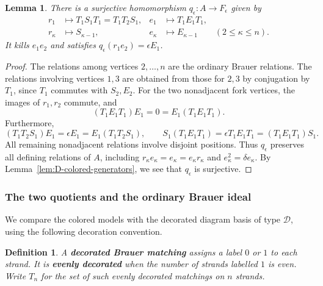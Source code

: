 \documentclass[11pt,a4paper]{amsart}
\newtheorem{lemma}[theorem]{Lemma}
\theoremstyle{uprightdefinition}
\newtheorem{definition}[theorem]{Definition}
\theoremstyle{remark}\newtheorem{remark}[theorem]{Remark}
\begin{document}
\begin{lemma}\label{lem:D-colored-map}
There is a surjective homomorphism $q_\epsilon:A\to F_\epsilon$ given by
\begin{align*}
 r_1&\longmapsto T_1S_1T_1=T_1T_2S_1,
 &e_1&\longmapsto T_1E_1T_1,\\
 r_{\kappa}&\longmapsto S_{\kappa-1},
 &e_{\kappa}&\longmapsto E_{\kappa-1}\qquad(2\leq \kappa\leq n).
\end{align*}
It kills $e_1e_2$ and satisfies $q_\epsilon(r_1e_2)=\epsilon E_1$.
\end{lemma}
\begin{proof}
The relations among vertices $2,\ldots,n$ are the ordinary Brauer
relations. The relations involving vertices $1,3$ are obtained from those
for $2,3$ by conjugation by $T_1$, since $T_1$ commutes with $S_2,E_2$.
For the two nonadjacent fork vertices, the images of $r_1,r_2$ commute,
and
\[
 (T_1E_1T_1)E_1=0=E_1(T_1E_1T_1).
\]
Furthermore,
\[
 (T_1T_2S_1)E_1=\epsilon E_1
   =E_1(T_1T_2S_1),\qquad
 S_1(T_1E_1T_1)=\epsilon T_1E_1T_1
   =(T_1E_1T_1)S_1.
\]
All remaining nonadjacent relations involve disjoint positions. Thus $q_\epsilon$ preserves all defining relations of $A$, including $r_{\kappa}e_{\kappa}=e_{\kappa}=e_{\kappa}r_{\kappa}$ and
$e_{\kappa}^2=\delta e_{\kappa}$. By Lemma~\ref{lem:D-colored-generators}, we see that $q_\epsilon$ is surjective.
\end{proof}

\subsubsection{The two quotients and the ordinary Brauer ideal}

We compare the colored models with the decorated diagram basis of type
$\mathscr{D}$, using the following decoration convention.

\begin{definition}\label{def:decorated-matchings}
\cite[Definition~4.2]{CGWDiagrams2007}
A
\textbf{decorated Brauer matching} assigns a label $0$ or $1$ to
each strand. It is \textbf{evenly decorated} when the number of
strands labelled $1$ is even. Write $T_n$ for the set of such
evenly decorated matchings on $n$ strands.
\end{definition}
\end{document}
